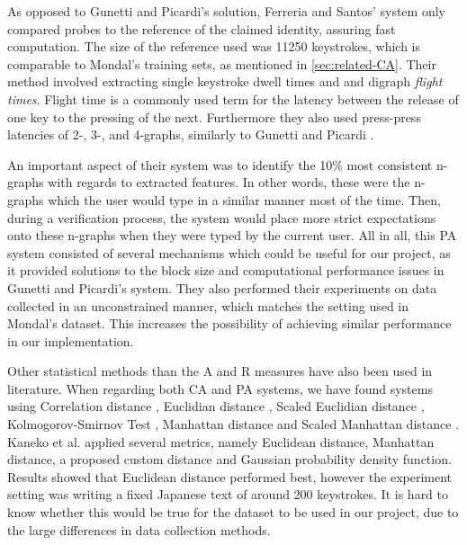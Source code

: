 \documentclass[informationsecurity]{gucmasterproject}
\begin{document}
As opposed to Gunetti and Picardi's solution, Ferreria and Santos' system only compared probes to the reference of the claimed identity, assuring fast computation.
The size of the reference used was 11250 keystrokes, which is comparable to Mondal's training sets, as mentioned in \cref{sec:related-CA}.
Their method involved extracting single keystroke dwell times and and digraph \textit{flight times}.
Flight time is a commonly used term for the latency between the release of one key to the pressing of the next.
Furthermore they also used press-press latencies of 2-, 3-, and 4-graphs, similarly to Gunetti and Picardi \cite{gnp}.

An important aspect of their system was to identify the 10\% most consistent n-graphs with regards to extracted features.
In other words, these were the n-graphs which the user would type in a similar manner most of the time.
Then, during a verification process, the system would place more strict expectations onto these n-graphs when they were typed by the current user.
All in all, this PA system consisted of several mechanisms which could be useful for our project, as it provided solutions to the block size and computational performance issues in Gunetti and Picardi's \cite{gnp} system.
They also performed their experiments on data collected in an unconstrained manner, which matches the setting used in Mondal's \cite{mondal} dataset. 
This increases the possibility of achieving similar performance in our implementation.

Other statistical methods than the A and R measures have also been used in literature.
When regarding both CA and PA systems, we have found systems using Correlation distance \cite{mondal}, Euclidian distance \cite{Monrose, Kaneko}, Scaled Euclidian distance \cite{mondal}, Kolmogorov-Smirnov Test \cite{park}, Manhattan distance \cite{Kaneko} and Scaled Manhattan distance \cite{BOURS201236}.
Kaneko et al. \cite{Kaneko} applied several metrics, namely Euclidean distance, Manhattan distance, a proposed custom distance and Gaussian probability density function. Results showed that Euclidean distance performed best, however the experiment setting was writing a fixed Japanese text of around 200 keystrokes.
It is hard to know whether this would be true for the dataset to be used in our project, due to the large differences in data collection methods.
\end{document}

